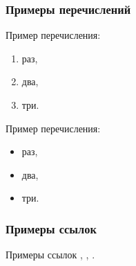 \documentclass[../main]{subfiles}
\begin{document}
\subsubsection{Примеры перечислений}
Пример перечисления:
\begin{enumerate}
    \item раз,
    \item два,
    \item три.
\end{enumerate}

Пример перечисления:
\begin{itemize}
    \item раз,
    \item два,
    \item три.
\end{itemize}

\subsubsection{Примеры ссылок}
Примеры ссылок \cite{texbook, latex:companion, latex2e, knuth:1984, lesk:1977}, \cite{texbook, latex2e, lesk:1977}, \cite{texbook, latex2e, knuth:1984, lesk:1977}.
\end{document}
